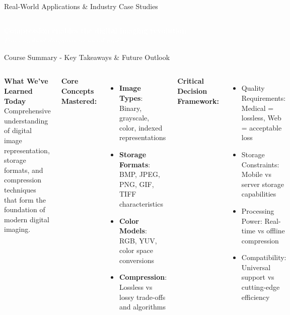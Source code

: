 \documentclass[aspectratio=1610,8pt]{beamer}
\newcommand{\highlight}[1]{\textcolor{navyblue}{\textbf{#1}}}
\begin{document}
\begin{frame}{Real-World Applications \& Industry Case Studies}
\begin{columns}[T]
\end{columns}

\vspace{0.5cm}
\begin{center}
\begin{tcolorbox}[colback=steelblue,colframe=steelblue,width=0.8\textwidth,center,boxrule=1pt]
\centering
\textcolor{white}{\textbf{Compression enables the digital imaging revolution}}\\
\textcolor{white}{\textit{From medical diagnosis to social media}}
\end{tcolorbox}
\end{center}

\end{frame}

\begin{frame}{Course Summary - Key Takeaways \& Future Outlook}
\begin{columns}[T]
\begin{alertblock}{\highlight{What We've Learned Today}}
Comprehensive understanding of digital image representation, storage formats, and compression techniques that form the foundation of modern digital imaging.
\end{alertblock}

\textbf{Core Concepts Mastered:}
\begin{itemize}
    \item \textbf{Image Types}: Binary, grayscale, color, indexed representations
    \item \textbf{Storage Formats}: BMP, JPEG, PNG, GIF, TIFF characteristics
    \item \textbf{Color Models}: RGB, YUV, color space conversions
    \item \textbf{Compression}: Lossless vs lossy trade-offs and algorithms
\end{itemize}

\textbf{Critical Decision Framework:}
\begin{itemize}
    \item Quality Requirements: Medical = lossless, Web = acceptable loss
    \item Storage Constraints: Mobile vs server storage capabilities
    \item Processing Power: Real-time vs offline compression
    \item Compatibility: Universal support vs cutting-edge efficiency
\end{itemize}


\end{columns}
\end{frame}
\end{document}
